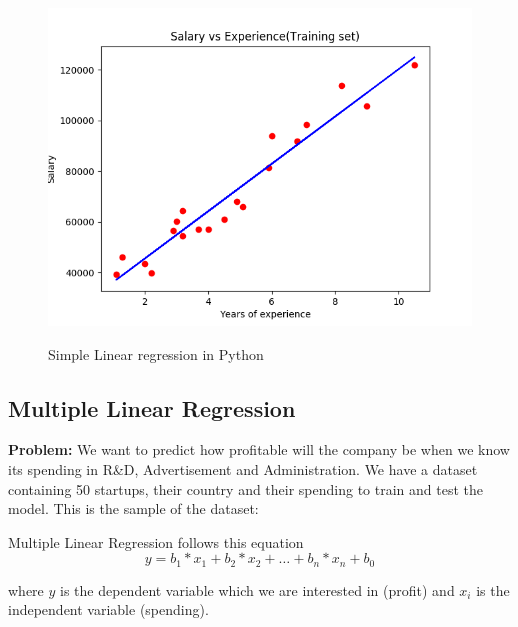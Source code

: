 \documentclass[runningheads,a4paper]{llncs}
\begin{document}
\begin{figure}[H]
\centering
\begin{center}
\includegraphics[scale=0.6]{pics/simple_linear_regression_python}
\label{uloha1:pic1}
\caption{Simple Linear regression in Python} 
\end{center}
\end{figure}



\subsection{Multiple Linear Regression}

\textbf{Problem:} We want to predict how profitable will the company be when we know its spending in R\&D, Advertisement and Administration. We have a dataset containing 50 startups, their country and their spending to train and test the model. This is the sample of the dataset:



Multiple Linear Regression follows this equation
\begin{equation}
y = b_1 * x_1 + b_2 * x_2 + \dots + b_n * x_n + b_0
\end{equation}

where $y$ is the dependent variable which we are interested in (profit) and $x_i$ is the independent variable (spending).
\end{document}
